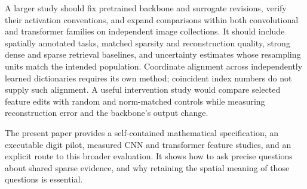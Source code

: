 A larger study should fix pretrained backbone and surrogate revisions,
verify their activation conventions, and expand comparisons within both
convolutional and transformer families on independent image collections. It
should include
spatially annotated tasks, matched sparsity and reconstruction quality,
strong dense and sparse retrieval baselines, and uncertainty estimates
whose resampling units match the intended population. Coordinate
alignment across independently learned dictionaries requires its own
method; coincident index numbers do not supply such alignment. A useful
intervention study would compare selected feature edits with random and
norm-matched controls while measuring reconstruction error and the
backbone's output change.

The present paper provides a self-contained mathematical specification,
an executable digit pilot, measured CNN and transformer feature studies,
and an explicit route to this broader evaluation.
It shows how to ask precise questions about shared sparse evidence, and
why retaining the spatial meaning of those questions is essential.
